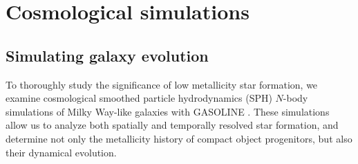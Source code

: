 \documentclass[nofootinbib,twocolumn,prd]{emulateapj}
\newcommand\editremark[1]{{\color{red}#1}}
\begin{document}




\section{Cosmological simulations}%
\label{sec:sims}

\subsection{Simulating galaxy evolution}
To thoroughly study the significance of low metallicity star
formation, we examine cosmological smoothed particle hydrodynamics
(SPH) $N$-body simulations of Milky Way-like galaxies with GASOLINE
\citep{Stadel01,Wadsley04}.  These simulations allow us to analyze both
spatially and temporally resolved star formation, and determine not
only the metallicity history of compact object progenitors, but also
their dynamical evolution.  
\end{document}
